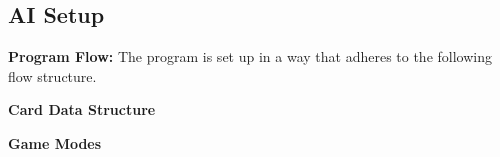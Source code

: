 \subsection{AI Setup}

\textbf{Program Flow:}
The program is set up in a way that adheres to the following flow structure.



\textbf{Card Data Structure}



\textbf{Game Modes}

